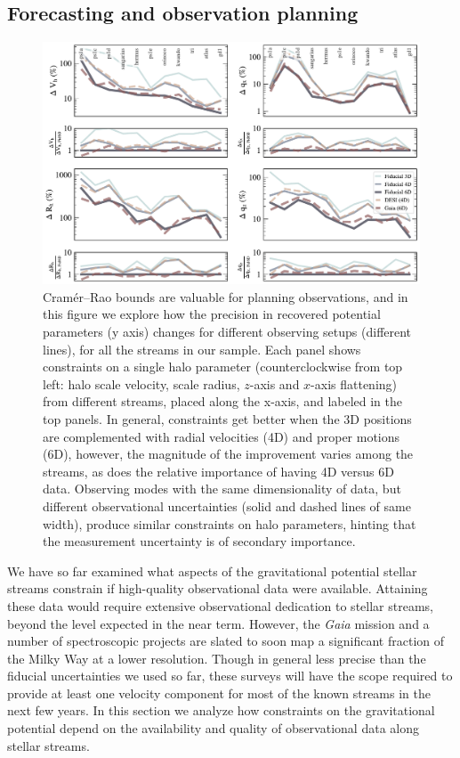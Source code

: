 \documentclass[modern]{aastex62}
\begin{document}
\subsection{Forecasting and observation planning}
\label{sec:forecast}
\begin{figure}
\begin{center}
\includegraphics[width=\textwidth]{obsmode_comparison.pdf}
\caption{Cram\'er--Rao bounds are valuable for planning observations, and in this figure we explore how the precision in recovered potential parameters (y axis) changes for different observing setups (different lines), for all the streams in our sample.
Each panel shows constraints on a single halo parameter (counterclockwise from top left: halo scale velocity, scale radius, $z$-axis and $x$-axis flattening) from different streams, placed along the x-axis, and labeled in the top panels.
In general, constraints get better when the 3D positions are complemented with radial velocities (4D) and proper motions (6D), however, the magnitude of the improvement varies among the streams, as does the relative importance of having 4D versus 6D data.
Observing modes with the same dimensionality of data, but different observational uncertainties (solid and dashed lines of same width), produce similar constraints on halo parameters, hinting that the measurement uncertainty is of secondary importance. 
}
\label{fig:obsmodes}
\end{center}
\end{figure}

We have so far examined what aspects of the gravitational potential stellar streams constrain if high-quality observational data were available.
Attaining these data would require extensive observational dedication to stellar streams, beyond the level expected in the near term.
However, the \emph{Gaia} mission and a number of spectroscopic projects are slated to soon map a significant fraction of the Milky Way at a lower resolution.
Though in general less precise than the fiducial uncertainties we used so far, these surveys will have the scope required to provide at least one velocity component for most of the known streams in the next few years.
In this section we analyze how constraints on the gravitational potential depend on the availability and quality of observational data along stellar streams. 
\end{document}
